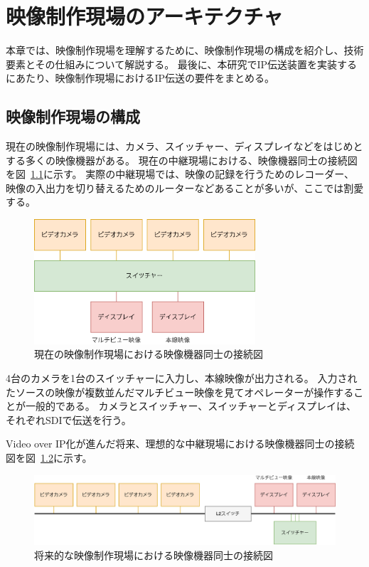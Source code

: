 \chapter{映像制作現場のアーキテクチャ}
\label{chap:video-production}

本章では、映像制作現場を理解するために、映像制作現場の構成を紹介し、技術要素とその仕組みについて解説する。
最後に、本研究でIP伝送装置を実装するにあたり、映像制作現場におけるIP伝送の要件をまとめる。

\section{映像制作現場の構成}

現在の映像制作現場には、カメラ、スイッチャー、ディスプレイなどをはじめとする多くの映像機器がある。
現在の中継現場における、映像機器同士の接続図を図~\ref{fig:broadcast-diagram-on-sdi}に示す。
実際の中継現場では、映像の記録を行うためのレコーダー、映像の入出力を切り替えるためのルーターなどあることが多いが、ここでは割愛する。

\begin{figure}[htbp]
  \begin{center}
    \includegraphics[bb=0 0 431 242,width=8.233cm]{img/broadcast-diagram-on-sdi.pdf}
  \end{center}
  \caption{現在の映像制作現場における映像機器同士の接続図}
  \label{fig:broadcast-diagram-on-sdi}
\end{figure}

4台のカメラを1台のスイッチャーに入力し、本線映像が出力される。
入力されたソースの映像が複数並んだマルチビュー映像を見てオペレーターが操作することが一般的である。
カメラとスイッチャー、スイッチャーとディスプレイは、それぞれSDIで伝送を行う。

Video over IP化が進んだ将来、理想的な中継現場における映像機器同士の接続図を図~\ref{fig:broadcast-diagram-on-ip}に示す。

\begin{figure}[htbp]
  \begin{center}
    \includegraphics[bb=0 0 787 182,width=15cm]{img/broadcast-diagram-on-ip.pdf}
  \end{center}
  \caption{将来的な映像制作現場における映像機器同士の接続図}
  \label{fig:broadcast-diagram-on-ip}
\end{figure}

